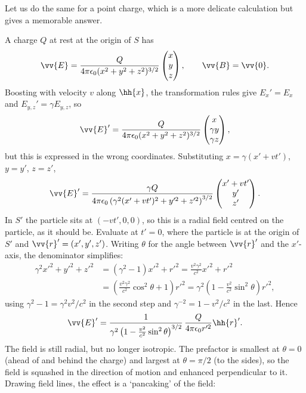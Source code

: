 Let us do the same for a point charge, which is a more delicate calculation but gives a memorable answer.

\begin{example}
	A charge $Q$ at rest at the origin of $S$ has
	$$
	\vv{E} = \frac{Q}{4\pi\epsilon_0(x^2+y^2+z^2)^{3/2}}\begin{pmatrix} x\\y\\z\end{pmatrix},\qquad \vv{B} = \vv{0}.
	$$
	Boosting with velocity $v$ along $\hh{x}$, the transformation rules give $E_x' = E_x$ and $E_{y,z}' = \gamma E_{y,z}$, so
	$$
	\vv{E}' = \frac{Q}{4\pi\epsilon_0(x^2+y^2+z^2)^{3/2}}\begin{pmatrix} x\\ \gamma y\\ \gamma z\end{pmatrix},
	$$
	but this is expressed in the wrong coordinates. Substituting $x = \gamma(x'+vt')$, $y = y'$, $z = z'$,
	$$
	\vv{E}' = \frac{\gamma Q}{4\pi\epsilon_0\left(\gamma^2(x'+vt')^2 + y'^2+z'^2\right)^{3/2}}\begin{pmatrix} x'+vt'\\ y'\\ z'\end{pmatrix}.
	$$
	In $S'$ the particle sits at $(-vt', 0,0)$, so this is a radial field centred on the particle, as it should be. Evaluate at $t' = 0$, where the particle is at the origin of $S'$ and $\vv{r}' = (x',y',z')$. Writing $\theta$ for the angle between $\vv{r}'$ and the $x'$-axis, the denominator simplifies:
	\begin{align*}
		\gamma^2 x'^2 + y'^2 + z'^2 &= (\gamma^2-1)x'^2 + r'^2 = \frac{v^2\gamma^2}{c^2}x'^2 + r'^2\\
		&= \left(\frac{v^2\gamma^2}{c^2}\cos^2\theta + 1\right)r'^2 = \gamma^2\left(1 - \frac{v^2}{c^2}\sin^2\theta\right)r'^2,
	\end{align*}
	using $\gamma^2 - 1 = \gamma^2v^2/c^2$ in the second step and $\gamma^{-2} = 1-v^2/c^2$ in the last. Hence
	$$
	\vv{E}' = \frac{1}{\gamma^2\left(1-\frac{v^2}{c^2}\sin^2\theta\right)^{3/2}}\,\frac{Q}{4\pi\epsilon_0 r'^2}\hh{r}'.
	$$
	The field is still radial, but no longer isotropic. The prefactor is smallest at $\theta = 0$ (ahead of and behind the charge) and largest at $\theta = \pi/2$ (to the sides), so the field is squashed in the direction of motion and enhanced perpendicular to it. Drawing field lines, the effect is a `pancaking' of the field:


\end{example}
